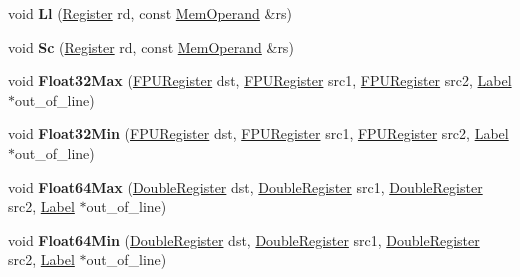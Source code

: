 \begin{DoxyCompactItemize}
void {\bfseries Ll} (\mbox{\hyperlink{classv8_1_1internal_1_1Register}{Register}} rd, const \mbox{\hyperlink{classv8_1_1internal_1_1MemOperand}{Mem\+Operand}} \&rs)
\item 
\mbox{\label{classv8_1_1internal_1_1TurboAssembler_ab699c0bcc8a92a867693a17b069db297}} 
void {\bfseries Sc} (\mbox{\hyperlink{classv8_1_1internal_1_1Register}{Register}} rd, const \mbox{\hyperlink{classv8_1_1internal_1_1MemOperand}{Mem\+Operand}} \&rs)
\item 
\mbox{\label{classv8_1_1internal_1_1TurboAssembler_a6d07c91604ec7dad8b3fbf11f246d0c3}} 
void {\bfseries Float32\+Max} (\mbox{\hyperlink{classv8_1_1internal_1_1FPURegister}{F\+P\+U\+Register}} dst, \mbox{\hyperlink{classv8_1_1internal_1_1FPURegister}{F\+P\+U\+Register}} src1, \mbox{\hyperlink{classv8_1_1internal_1_1FPURegister}{F\+P\+U\+Register}} src2, \mbox{\hyperlink{classv8_1_1internal_1_1Label}{Label}} $\ast$out\+\_\+of\+\_\+line)
\item 
\mbox{\label{classv8_1_1internal_1_1TurboAssembler_a6f94494f0ef3b0446a0262e6cdf7f70b}} 
void {\bfseries Float32\+Min} (\mbox{\hyperlink{classv8_1_1internal_1_1FPURegister}{F\+P\+U\+Register}} dst, \mbox{\hyperlink{classv8_1_1internal_1_1FPURegister}{F\+P\+U\+Register}} src1, \mbox{\hyperlink{classv8_1_1internal_1_1FPURegister}{F\+P\+U\+Register}} src2, \mbox{\hyperlink{classv8_1_1internal_1_1Label}{Label}} $\ast$out\+\_\+of\+\_\+line)
\item 
\mbox{\label{classv8_1_1internal_1_1TurboAssembler_a7af40dfb84732a26159ad7670b9be1c8}} 
void {\bfseries Float64\+Max} (\mbox{\hyperlink{classv8_1_1internal_1_1DoubleRegister}{Double\+Register}} dst, \mbox{\hyperlink{classv8_1_1internal_1_1DoubleRegister}{Double\+Register}} src1, \mbox{\hyperlink{classv8_1_1internal_1_1DoubleRegister}{Double\+Register}} src2, \mbox{\hyperlink{classv8_1_1internal_1_1Label}{Label}} $\ast$out\+\_\+of\+\_\+line)
\item 
\mbox{\label{classv8_1_1internal_1_1TurboAssembler_a920681960d17458365e5c1877f0e6c7e}} 
void {\bfseries Float64\+Min} (\mbox{\hyperlink{classv8_1_1internal_1_1DoubleRegister}{Double\+Register}} dst, \mbox{\hyperlink{classv8_1_1internal_1_1DoubleRegister}{Double\+Register}} src1, \mbox{\hyperlink{classv8_1_1internal_1_1DoubleRegister}{Double\+Register}} src2, \mbox{\hyperlink{classv8_1_1internal_1_1Label}{Label}} $\ast$out\+\_\+of\+\_\+line)

\end{DoxyCompactItemize}
